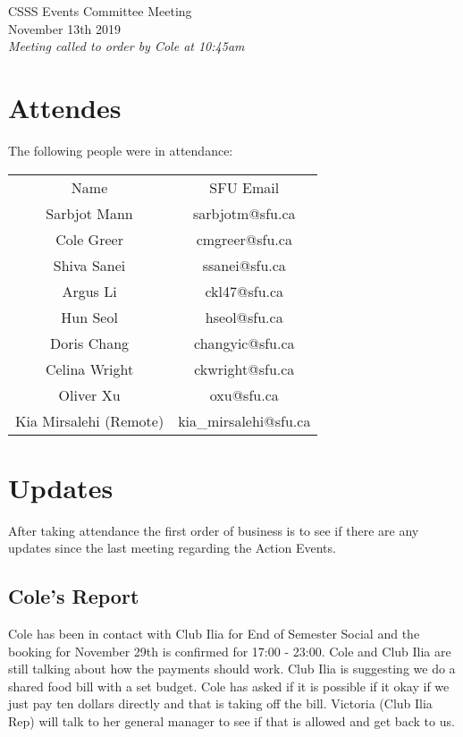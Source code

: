 \documentclass[12pt]{article}
\begin{document}
\begin{center}
CSSS Events Committee Meeting \\
November 13th 2019 \\
\em Meeting called to order by Cole at 10:45am
\end{center}
\tableofcontents
\newpage 
\section{Attendes} \label{sec:Introduction}
The following people were in attendance: 
\begin{table}[h]
\centering
\begin{tabular}{cc}
Name                   & SFU Email             \\
Sarbjot Mann           & sarbjotm@sfu.ca       \\
Cole Greer             & cmgreer@sfu.ca        \\
Shiva Sanei            & ssanei@sfu.ca         \\
Argus Li               & ckl47@sfu.ca          \\
Hun Seol               & hseol@sfu.ca          \\
Doris Chang            & changyic@sfu.ca       \\
Celina Wright          & ckwright@sfu.ca       \\
Oliver Xu              & oxu@sfu.ca            \\
Kia Mirsalehi (Remote) & kia\_mirsalehi@sfu.ca
\end{tabular}
\end{table}

\section{Updates} \label{sec:Updates}

\noindent After taking attendance the first order of business is to see if there are any updates since the last meeting regarding the Action Events.

\subsection{Cole's Report}
\noindent Cole has been in contact with Club Ilia for End of Semester Social and the booking for November 29th is confirmed for 17:00 - 23:00. Cole and Club Ilia are still talking about how the payments should work. Club Ilia is suggesting we do a shared food bill with a set budget. Cole has asked if it is possible if it okay if we just pay ten dollars directly and that is taking off the bill. Victoria (Club Ilia Rep) will talk to her general manager to see if that is allowed and get back to us. 
\end{document}
